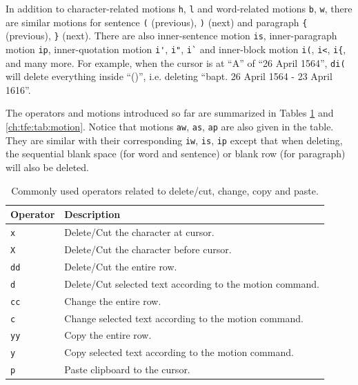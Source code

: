 In addition to character-related motions \verb|h|, \verb|l| and word-related motions  \verb|b|, \verb|w|, there are similar motions for sentence \verb|(| (previous), \verb|)| (next) and paragraph \verb|{| (previous), \verb|}| (next). There are also inner-sentence motion \verb|is|, inner-paragraph motion \verb|ip|, inner-quotation motion \verb|i'|, \verb|i"|, \verb|i`| and inner-block motion \verb|i(|, \verb|i<|, \verb|i{|, and many more. For example, when the cursor is at ``A'' of ``26 April 1564'', \verb|di(| will delete everything inside ``()'', i.e. deleting ``bapt. 26 April 1564 - 23 April 1616''.

The operators and motions introduced so far are summarized in Tables \ref{ch:tfe:tab:deletecut} and \ref{ch:tfe:tab:motion}. Notice that motions \verb|aw|, \verb|as|, \verb|ap| are also given in the table. They are similar with their corresponding \verb|iw|, \verb|is|, \verb|ip| except that when deleting, the sequential blank space (for word and sentence) or blank row (for paragraph) will also be deleted.

\begin{table}
  \centering \caption{Commonly used operators related to delete/cut, change, copy and paste.}\label{ch:tfe:tab:deletecut}
  \begin{tabularx}{\textwidth}{lX}
    \hline
    Operator & Description \\ \hline
    \verb|x| & Delete/Cut the character at cursor. \\ 
    \verb|X| & Delete/Cut the character before cursor. \\ 
    \verb|dd| & Delete/Cut the entire row. \\ 
    \verb|d| & Delete/Cut selected text according to the motion command. \\ 
    \verb|cc| & Change the entire row. \\ 
    \verb|c| & Change selected text according to the motion command. \\ 
    \verb|yy| & Copy the entire row. \\ 
    \verb|y| & Copy selected text according to the motion command. \\ 
    \verb|p| & Paste clipboard to the cursor. \\
    \hline
  \end{tabularx}
\end{table}


